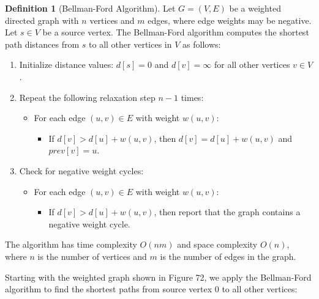 \documentclass{article}
\theoremstyle{definition}
\newtheorem{definition}{Definition}
\begin{document}
\begin{definition}[Bellman-Ford Algorithm]
Let $G = (V, E)$ be a weighted directed graph with $n$ vertices and $m$ edges, where edge weights may be negative. Let $s \in V$ be a source vertex. The Bellman-Ford algorithm computes the shortest path distances from $s$ to all other vertices in $V$ as follows:

\begin{enumerate}
\item Initialize distance values: $d[s] = 0$ and $d[v] = \infty$ for all other vertices $v \in V$.
\item Repeat the following relaxation step $n-1$ times:
   \begin{itemize}
   \item For each edge $(u,v) \in E$ with weight $w(u,v)$:
      \begin{itemize}
      \item If $d[v] > d[u] + w(u,v)$, then $d[v] = d[u] + w(u,v)$ and $prev[v] = u$.
      \end{itemize}
   \end{itemize}
\item Check for negative weight cycles:
   \begin{itemize}
   \item For each edge $(u,v) \in E$ with weight $w(u,v)$:
      \begin{itemize}
      \item If $d[v] > d[u] + w(u,v)$, then report that the graph contains a negative weight cycle.
      \end{itemize}
   \end{itemize}
\end{enumerate}

The algorithm has time complexity $O(nm)$ and space complexity $O(n)$, where $n$ is the number of vertices and $m$ is the number of edges in the graph.
\end{definition}

Starting with the weighted graph shown in Figure 72, we apply the Bellman-Ford algorithm to find the shortest paths from source vertex 0 to all other vertices:
\end{document}
